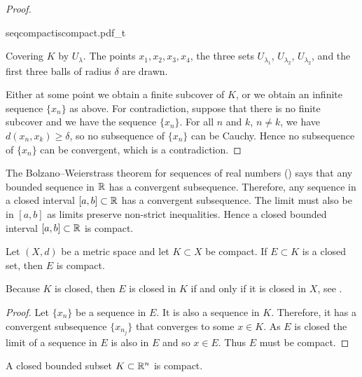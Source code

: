 \begin{proof}
\begin{myfigureht}
{seqcompactiscompact.pdf_t}
\caption{Covering $K$ by $U_{\lambda}$.  The points
$x_1,x_2,x_3,x_4$, 
the three sets 
$U_{\lambda_1}$,
$U_{\lambda_2}$,
$U_{\lambda_2}$,
and 
the first three balls
of radius $\delta$ are drawn.\label{fig:seqcompactiscompact}}
\end{myfigureht}

Either at some point we obtain a finite subcover of $K$,
or we obtain an
infinite
sequence $\{ x_n \}$ as above.
For contradiction, suppose that
there is no finite subcover and we have the sequence $\{ x_n \}$.
For all $n$ and $k$, $n \not= k$, 
we have $d(x_n,x_k) \geq \delta$,
so no subsequence of $\{ x_n \}$ can be
Cauchy.  Hence no subsequence of $\{ x_n \}$ can be convergent,
which is a contradiction.
\end{proof}

\begin{example}
The Bolzano--Weierstrass theorem for sequences of real numbers
()
says that any bounded sequence in ${\mathbb{R}}$ has a convergent
subsequence.  Therefore, any sequence in a closed interval $[a,b] \subset {\mathbb{R}}$ has 
a convergent subsequence.  The limit must also be in $[a,b]$ as limits
preserve non-strict inequalities.  Hence a closed bounded interval $[a,b]
\subset {\mathbb{R}}$ is compact.
\end{example}

\begin{prop}
Let $(X,d)$ be a metric space and let $K \subset X$ be compact.  If
$E \subset K$ is a closed set, then $E$ is compact.
\end{prop}

Because $K$ is closed, then $E$ is closed in $K$ if
and only if it is closed in $X$,
see .

\begin{proof}
Let $\{ x_n \}$ be a sequence in $E$.  It is also a sequence in $K$.
Therefore, it has a convergent subsequence $\{ x_{n_j} \}$ that converges to
some $x \in K$.  As $E$ is closed the limit of a sequence in $E$ is also in $E$
and so $x \in E$.  Thus $E$ must be compact.
\end{proof}

\begin{thm}%
\label{thm:msbw}
A closed bounded subset $K \subset {\mathbb{R}}^n$ is compact.
\end{thm}

